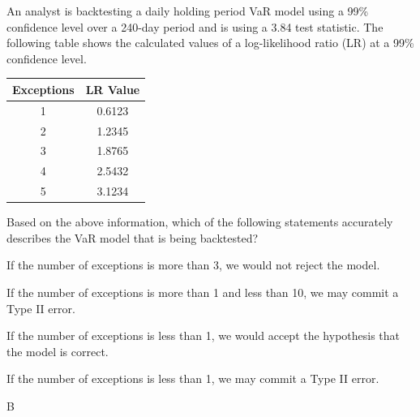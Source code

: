 \documentclass{article}
\newcounter{question} %
\begin{document}
\begin{question}
    An analyst is backtesting a daily holding period VaR model using a 99\% confidence level over a 240-day period and is using a 3.84 test statistic. The following table shows the calculated values of a log-likelihood ratio (LR) at a 99\% confidence level. 

    \begin{table}[H]
        \centering
        \begin{tabular}{|c|c|}
            \hline
            Exceptions & LR Value \\
            \hline
            1 & 0.6123 \\
            2 & 1.2345 \\
            3 & 1.8765 \\
            4 & 2.5432 \\
            5 & 3.1234 \\
            \hline
        \end{tabular}
    \end{table}
    Based on the above information, which of the following statements accurately describes the VaR model that is being backtested?
\end{question}

\begin{choices}
    \item If the number of exceptions is more than 3, we would not reject the model.
    \item If the number of exceptions is more than 1 and less than 10, we may commit a Type II error.
    \item If the number of exceptions is less than 1, we would accept the hypothesis that the model is correct.
    \item If the number of exceptions is less than 1, we may commit a Type II error.
\end{choices}

\begin{correctanswer}
    B
\end{correctanswer}
\end{document}
